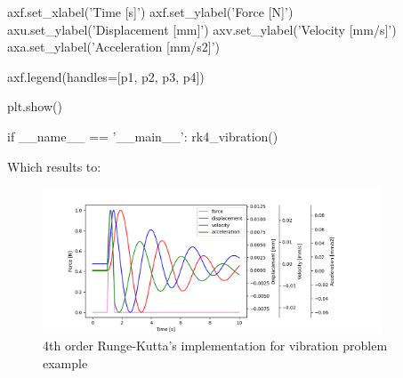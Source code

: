 \documentclass[10pt,b5paper,titlepage]{book}
\begin{document}
\begin{python}
    axf.set_xlabel('Time [s]')
    axf.set_ylabel('Force [N]')
    axu.set_ylabel('Displacement [mm]')
    axv.set_ylabel('Velocity [mm/s]')
    axa.set_ylabel('Acceleration [mm/s2]')

    axf.legend(handles=[p1, p2, p3, p4])

    plt.show()

if __name__ == '__main__':
    rk4_vibration()

\end{python}

Which results to:
\begin{figure}[ht]
    \centering
    \includegraphics[width=0.90\textwidth]{img/rk4_example.png}
    \caption{4th order Runge-Kutta's implementation for vibration problem example}
    \label{fig:rk4-example-png}
\end{figure}
\end{document}
